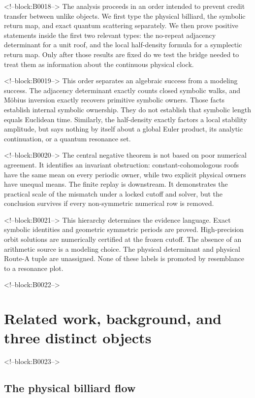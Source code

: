 \documentclass[11pt,a4paper]{article}
\theoremstyle{definition}
\theoremstyle{remark}
\begin{document}
<!--block:B0018-->
The analysis proceeds in an order intended to prevent credit transfer between unlike objects. We first type the physical billiard, the symbolic return map, and exact quantum scattering separately. We then prove positive statements inside the first two relevant types: the no-repeat adjacency determinant for a unit roof, and the local half-density formula for a symplectic return map. Only after those results are fixed do we test the bridge needed to treat them as information about the continuous physical clock.

<!--block:B0019-->
This order separates an algebraic success from a modeling success. The adjacency determinant exactly counts closed symbolic walks, and Möbius inversion exactly recovers primitive symbolic owners. Those facts establish internal symbolic ownership. They do not establish that symbolic length equals Euclidean time. Similarly, the half-density exactly factors a local stability amplitude, but says nothing by itself about a global Euler product, its analytic continuation, or a quantum resonance set.

<!--block:B0020-->
The central negative theorem is not based on poor numerical agreement. It identifies an invariant obstruction: constant-cohomologous roofs have the same mean on every periodic owner, while two explicit physical owners have unequal means. The finite replay is downstream. It demonstrates the practical scale of the mismatch under a locked cutoff and solver, but the conclusion survives if every non-symmetric numerical row is removed.

<!--block:B0021-->
This hierarchy determines the evidence language. Exact symbolic identities and geometric symmetric periods are proved. High-precision orbit solutions are numerically certified at the frozen cutoff. The absence of an arithmetic source is a modeling choice. The physical determinant and physical Route-A tuple are unassigned. None of these labels is promoted by resemblance to a resonance plot.

<!--block:B0022-->
\section{Related work, background, and three distinct objects}

<!--block:B0023-->
\subsection{The physical billiard flow}
\end{document}
